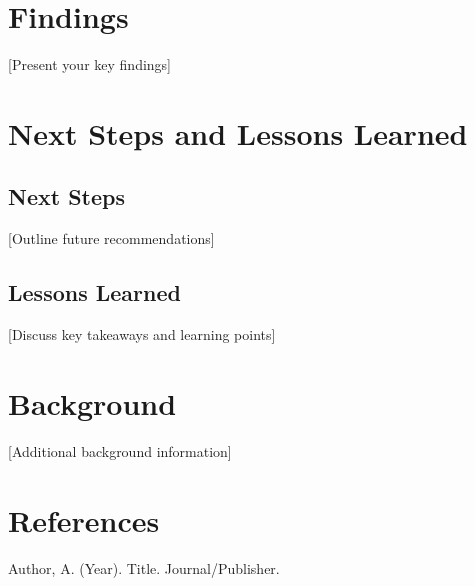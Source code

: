 \documentclass[12pt,a4paper]{article}
\begin{document}
\section{Findings}
[Present your key findings]

\section{Next Steps and Lessons Learned}
\subsection{Next Steps}
[Outline future recommendations]

\subsection{Lessons Learned}
[Discuss key takeaways and learning points]

\begin{appendices}
\section{Background}
[Additional background information]

\section{References}
\begin{thebibliography}{9}
     Author, A. (Year). Title. Journal/Publisher.
\end{thebibliography}
\end{appendices}
\end{document}
